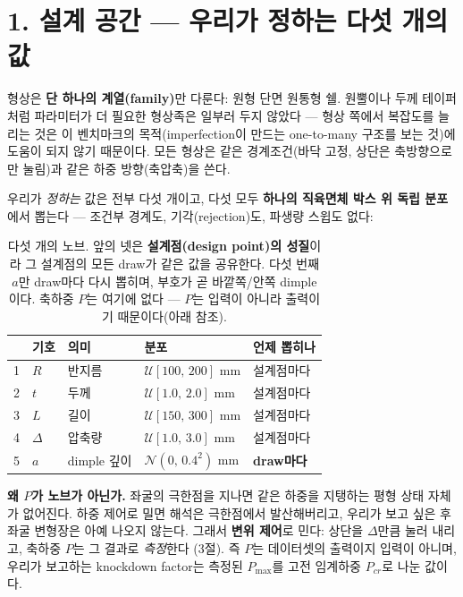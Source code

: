 \documentclass[11pt]{article}
\begin{document}
\section{1. 설계 공간 --- 우리가 정하는 다섯 개의 값}

형상은 \textbf{단 하나의 계열(family)}만 다룬다: 원형 단면 원통형 쉘. 원뿔이나
두께 테이퍼처럼 파라미터가 더 필요한 형상족은 일부러 두지 않았다 --- 형상
쪽에서 복잡도를 늘리는 것은 이 벤치마크의 목적(imperfection이 만드는
one-to-many 구조를 보는 것)에 도움이 되지 않기 때문이다. 모든 형상은 같은
경계조건(바닥 고정, 상단은 축방향으로만 눌림)과 같은 하중 방향(축압축)을 쓴다.

우리가 \emph{정하는} 값은 전부 다섯 개이고, 다섯 모두 \textbf{하나의 직육면체
박스 위 독립 분포}에서 뽑는다 --- 조건부 경계도, 기각(rejection)도, 파생량
스윕도 없다:

\begin{table}[h]
\centering
\small
\begin{tabular}{@{}cllll@{}}
\toprule
 & 기호 & 의미 & 분포 & 언제 뽑히나 \\
\midrule
1 & $R$      & 반지름   & $\mathcal{U}[100,\,200]$ mm & 설계점마다 \\
2 & $t$      & 두께     & $\mathcal{U}[1.0,\,2.0]$ mm & 설계점마다 \\
3 & $L$      & 길이     & $\mathcal{U}[150,\,300]$ mm & 설계점마다 \\
4 & $\Delta$ & 압축량   & $\mathcal{U}[1.0,\,3.0]$ mm & 설계점마다 \\
\midrule
5 & $a$      & dimple 깊이 & $\mathcal{N}(0,\,0.4^2)$ mm & \textbf{draw마다} \\
\bottomrule
\end{tabular}
\caption{다섯 개의 노브. 앞의 넷은 \textbf{설계점(design point)의 성질}이라
그 설계점의 모든 draw가 같은 값을 공유한다. 다섯 번째 $a$만 draw마다 다시
뽑히며, 부호가 곧 바깥쪽/안쪽 dimple이다. 축하중 $P$는 여기에 없다 --- $P$는
입력이 아니라 출력이기 때문이다(아래 참조).}
\end{table}

\noindent
\textbf{왜 $P$가 노브가 아닌가.} 좌굴의 극한점을 지나면 같은 하중을 지탱하는
평형 상태 자체가 없어진다. 하중 제어로 밀면 해석은 극한점에서 발산해버리고,
우리가 보고 싶은 후좌굴 변형장은 아예 나오지 않는다. 그래서 \textbf{변위 제어}로
민다: 상단을 $\Delta$만큼 눌러 내리고, 축하중 $P$는 그 결과로 \emph{측정}한다
(3절). 즉 $P$는 데이터셋의 출력이지 입력이 아니며, 우리가 보고하는 knockdown
factor는 측정된 $P_{\max}$를 고전 임계하중 $P_{cr}$로 나눈 값이다.
\end{document}
